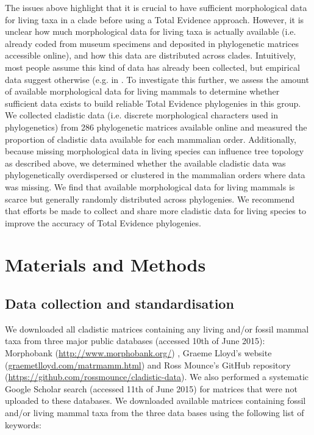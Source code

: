The issues above highlight that it is crucial to have sufficient morphological data for living taxa in a clade before using a Total Evidence approach.
However, it is unclear how much morphological data for living taxa is actually available (i.e. already coded from museum specimens and deposited in phylogenetic matrices accessible online), and how this data are distributed across clades.
Intuitively, most people assume this kind of data has already been collected, but empirical data suggest otherwise (e.g. in \citep{ronquista2012,Slater2012MEE,beckancient2014}.
To investigate this further, we assess the amount of available morphological data for living mammals to determine whether sufficient data exists to build reliable Total Evidence phylogenies in this group.
We collected cladistic data (i.e. discrete morphological characters used in phylogenetics) from 286 phylogenetic matrices available online and measured the proportion of cladistic data available for each mammalian order.
Additionally, because missing morphological data in living species can influence tree topology as described above, %
we determined whether the available cladistic data was phylogenetically overdispersed or clustered in the mammalian orders where data was missing. 
We find that available morphological data for living mammals is scarce but generally randomly distributed across phylogenies. 
We recommend that efforts be made to collect and share more cladistic data for living species to improve the accuracy of Total Evidence phylogenies.

%
%
\section{Materials and Methods}
\subsection{Data collection and standardisation}
We downloaded all cladistic matrices containing any living and/or fossil mammal taxa from three major public databases (accessed 10th of June 2015): Morphobank (\url{http://www.morphobank.org/}) \citep{morphobank}, Graeme Lloyd's website (\url{graemetlloyd.com/matrmamm.html}) and Ross Mounce's GitHub repository (\url{https://github.com/rossmounce/cladistic-data}).
We also performed a systematic Google Scholar search (accessed 11th of June 2015) for matrices that were not uploaded to these databases. We downloaded available matrices containing fossil and/or living mammal taxa from the three data bases using the following list of keywords:

